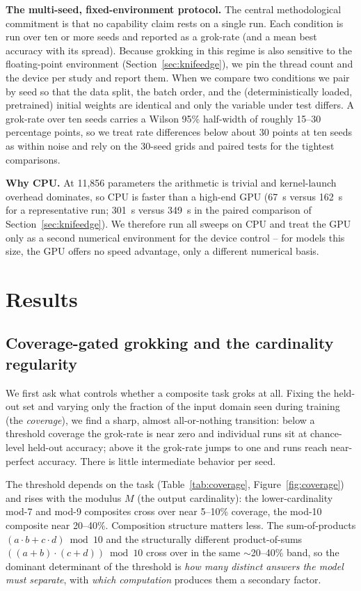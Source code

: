 \documentclass[10pt]{article} %
\begin{document}
\textbf{The multi-seed, fixed-environment protocol.} The central methodological commitment is that
no capability claim rests on a single run. Each condition is run over ten or more seeds and
reported as a grok-rate (and a mean best accuracy with its spread). Because grokking in this
regime is also sensitive to the floating-point environment (Section~\ref{sec:knifeedge}), we pin
the thread count and the device per study and report them. When we compare two conditions we pair
by seed so that the data split, the batch order, and the (deterministically loaded, pretrained)
initial weights are identical and only the variable under test differs. A grok-rate over ten seeds
carries a Wilson 95\% half-width of roughly 15--30 percentage points, so we treat rate differences
below about 30 points at ten seeds as within noise and rely on the 30-seed grids and paired tests
for the tightest comparisons.

\textbf{Why CPU.} At 11{,}856 parameters the arithmetic is trivial and kernel-launch overhead
dominates, so CPU is faster than a high-end GPU (67~s versus 162~s for a representative run; 301~s
versus 349~s in the paired comparison of Section~\ref{sec:knifeedge}). We therefore run all sweeps
on CPU and treat the GPU only as a second numerical environment for the device control -- for models
this size, the GPU offers no speed advantage, only a different numerical basis.

\section{Results}
\label{sec:results}

\subsection{Coverage-gated grokking and the cardinality regularity}
\label{sec:coverage}

We first ask what controls whether a composite task groks at all. Fixing the held-out set and
varying only the fraction of the input domain seen during training (the \emph{coverage}), we find
a sharp, almost all-or-nothing transition: below a threshold coverage the grok-rate is near zero
and individual runs sit at chance-level held-out accuracy; above it the grok-rate jumps to one and
runs reach near-perfect accuracy. There is little intermediate behavior per seed.

The threshold depends on the task (Table~\ref{tab:coverage}, Figure~\ref{fig:coverage}) and rises
with the modulus $M$ (the output cardinality): the lower-cardinality mod-7 and mod-9 composites
cross over near 5--10\% coverage, the mod-10 composite near 20--40\%. Composition structure matters
less. The sum-of-products $(a\cdot b + c\cdot d)\bmod 10$ and the structurally different
product-of-sums $((a{+}b)\cdot(c{+}d))\bmod 10$ cross over in the same $\sim$20--40\% band, so the
dominant determinant of the threshold is \emph{how many distinct answers the model must separate},
with \emph{which computation} produces them a secondary factor.
\end{document}

